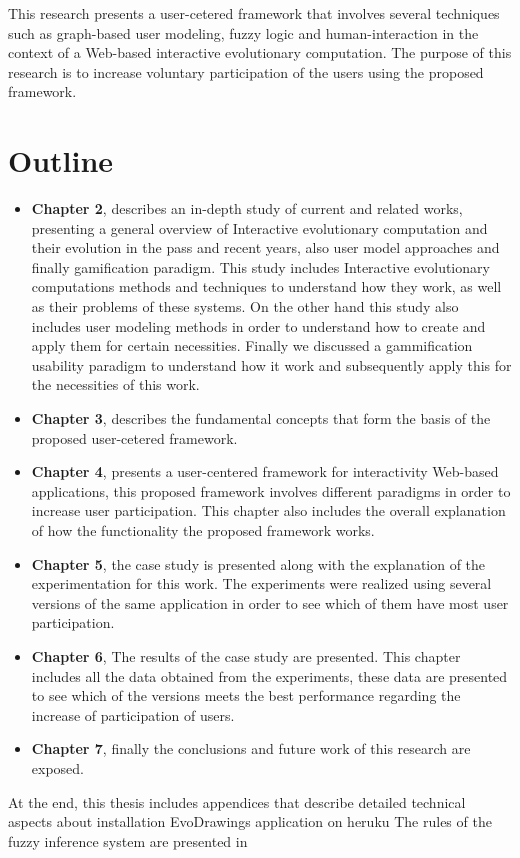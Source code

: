\par This research presents a user-cetered framework that involves several techniques 
such as graph-based user modeling, fuzzy logic and human-interaction in the context 
of a Web-based interactive evolutionary computation. The purpose of this research 
is to increase voluntary participation of the users  using the proposed framework.

\section{Outline}



\begin{itemize}  
\item \textbf{Chapter 2}, describes an in-depth study
 of current and related works, presenting a general
overview of Interactive evolutionary computation and their evolution in the pass and recent years, also user model approaches and finally gamification paradigm.
This study includes Interactive evolutionary computations methods
and techniques to understand how they work, as well as their problems
of these systems. On the other hand this study also includes user modeling methods in order to understand how to create and apply them for certain necessities. Finally we discussed a gammification usability paradigm to understand how it work and subsequently apply this
for the necessities of this work.  
\item \textbf{Chapter 3}, describes the fundamental
concepts that form the basis of the proposed user-cetered framework.
\item \textbf{Chapter 4}, presents a user-centered framework for interactivity Web-based
applications, this proposed framework involves different paradigms in order to increase
user participation. This chapter also includes the
overall explanation of how the functionality the proposed framework works.
\item \textbf {Chapter 5}, the case study is presented along with the explanation
of the experimentation for this work. The experiments were realized using several versions of
the same application in order to see which of them have most user participation.
\item \textbf {Chapter 6}, The results of the case study are presented. This chapter includes all the data obtained from the experiments, these data are presented to see which of the versions meets the best performance regarding the increase of participation of users.
\item \textbf {Chapter 7}, finally the conclusions and future work of this research are exposed.
\end{itemize}  
At the end, this thesis includes appendices that describe
detailed technical aspects about installation EvoDrawings application on heruku
The rules of the fuzzy inference system are presented in  %
